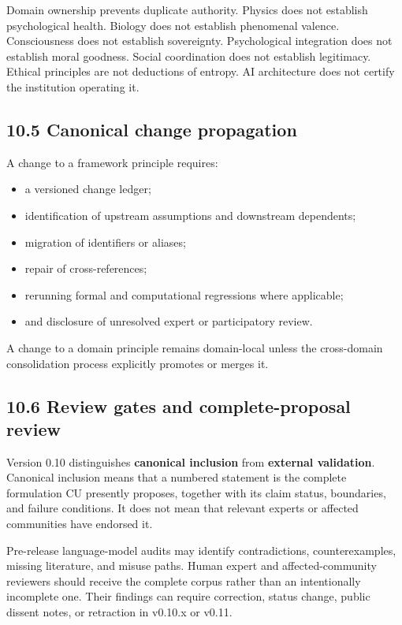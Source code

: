 \documentclass[
  11pt,
]{article}
\providecommand{\tightlist}{%
  \setlength{\itemsep}{0pt}\setlength{\parskip}{0pt}}
\begin{document}
Domain ownership prevents duplicate authority. Physics does not
establish psychological health. Biology does not establish phenomenal
valence. Consciousness does not establish sovereignty. Psychological
integration does not establish moral goodness. Social coordination does
not establish legitimacy. Ethical principles are not deductions of
entropy. AI architecture does not certify the institution operating it.

\subsection{10.5 Canonical change
propagation}\label{canonical-change-propagation}

A change to a framework principle requires:

\begin{itemize}
\tightlist
\item
  a versioned change ledger;
\item
  identification of upstream assumptions and downstream dependents;
\item
  migration of identifiers or aliases;
\item
  repair of cross-references;
\item
  rerunning formal and computational regressions where applicable;
\item
  and disclosure of unresolved expert or participatory review.
\end{itemize}

A change to a domain principle remains domain-local unless the
cross-domain consolidation process explicitly promotes or merges it.

\subsection{10.6 Review gates and complete-proposal
review}\label{review-gates-and-complete-proposal-review}

Version 0.10 distinguishes \textbf{canonical inclusion} from
\textbf{external validation}. Canonical inclusion means that a numbered
statement is the complete formulation CU presently proposes, together
with its claim status, boundaries, and failure conditions. It does not
mean that relevant experts or affected communities have endorsed it.

Pre-release language-model audits may identify contradictions,
counterexamples, missing literature, and misuse paths. Human expert and
affected-community reviewers should receive the complete corpus rather
than an intentionally incomplete one. Their findings can require
correction, status change, public dissent notes, or retraction in
v0.10.x or v0.11.
\end{document}
